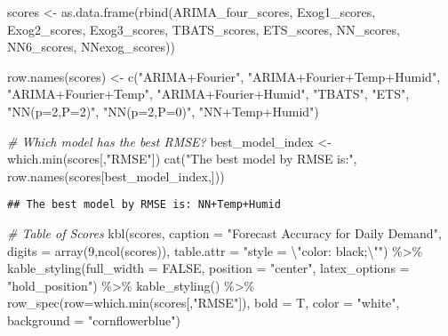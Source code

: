 \documentclass[
]{article}
\newenvironment{Shaded}{\begin{snugshade}}{\end{snugshade}}
\newcommand{\AttributeTok}[1]{\textcolor[rgb]{0.77,0.63,0.00}{#1}}
\newcommand{\CommentTok}[1]{\textcolor[rgb]{0.56,0.35,0.01}{\textit{#1}}}
\newcommand{\ConstantTok}[1]{\textcolor[rgb]{0.00,0.00,0.00}{#1}}
\newcommand{\DecValTok}[1]{\textcolor[rgb]{0.00,0.00,0.81}{#1}}
\newcommand{\FunctionTok}[1]{\textcolor[rgb]{0.00,0.00,0.00}{#1}}
\newcommand{\NormalTok}[1]{#1}
\newcommand{\OtherTok}[1]{\textcolor[rgb]{0.56,0.35,0.01}{#1}}
\newcommand{\SpecialCharTok}[1]{\textcolor[rgb]{0.00,0.00,0.00}{#1}}
\newcommand{\StringTok}[1]{\textcolor[rgb]{0.31,0.60,0.02}{#1}}
\begin{document}
\begin{Shaded}
\begin{Highlighting}[]
\NormalTok{scores }\OtherTok{\textless{}{-}} \FunctionTok{as.data.frame}\NormalTok{(}\FunctionTok{rbind}\NormalTok{(ARIMA\_four\_scores, Exog1\_scores, Exog2\_scores, Exog3\_scores, }
\NormalTok{                              TBATS\_scores, ETS\_scores, NN\_scores, NN6\_scores, NNexog\_scores))}

\FunctionTok{row.names}\NormalTok{(scores) }\OtherTok{\textless{}{-}} \FunctionTok{c}\NormalTok{(}\StringTok{"ARIMA+Fourier"}\NormalTok{, }\StringTok{"ARIMA+Fourier+Temp+Humid"}\NormalTok{, }\StringTok{"ARIMA+Fourier+Temp"}\NormalTok{, }
                       \StringTok{"ARIMA+Fourier+Humid"}\NormalTok{, }\StringTok{"TBATS"}\NormalTok{, }\StringTok{"ETS"}\NormalTok{, }\StringTok{"NN(p=2,P=2)"}\NormalTok{, }\StringTok{"NN(p=2,P=0)"}\NormalTok{, }\StringTok{"NN+Temp+Humid"}\NormalTok{)}

\CommentTok{\# Which model has the best RMSE?}
\NormalTok{best\_model\_index }\OtherTok{\textless{}{-}} \FunctionTok{which.min}\NormalTok{(scores[,}\StringTok{"RMSE"}\NormalTok{])}
\FunctionTok{cat}\NormalTok{(}\StringTok{"The best model by RMSE is:"}\NormalTok{, }\FunctionTok{row.names}\NormalTok{(scores[best\_model\_index,]))  }
\end{Highlighting}
\end{Shaded}

\begin{verbatim}
## The best model by RMSE is: NN+Temp+Humid
\end{verbatim}

\begin{Shaded}
\begin{Highlighting}[]
\CommentTok{\# Table of Scores}
\FunctionTok{kbl}\NormalTok{(scores,}
    \AttributeTok{caption =} \StringTok{"Forecast Accuracy for Daily Demand"}\NormalTok{,}
    \AttributeTok{digits =} \FunctionTok{array}\NormalTok{(}\DecValTok{9}\NormalTok{,}\FunctionTok{ncol}\NormalTok{(scores)),}
    \AttributeTok{table.attr =} \StringTok{"style = }\SpecialCharTok{\textbackslash{}"}\StringTok{color: black;}\SpecialCharTok{\textbackslash{}"}\StringTok{"}\NormalTok{) }\SpecialCharTok{\%\textgreater{}\%}
  \FunctionTok{kable\_styling}\NormalTok{(}\AttributeTok{full\_width =} \ConstantTok{FALSE}\NormalTok{, }\AttributeTok{position =} \StringTok{"center"}\NormalTok{, }\AttributeTok{latex\_options =} \StringTok{"hold\_position"}\NormalTok{) }\SpecialCharTok{\%\textgreater{}\%}
  \FunctionTok{kable\_styling}\NormalTok{() }\SpecialCharTok{\%\textgreater{}\%}
  \FunctionTok{row\_spec}\NormalTok{(}\AttributeTok{row=}\FunctionTok{which.min}\NormalTok{(scores[,}\StringTok{"RMSE"}\NormalTok{]), }\AttributeTok{bold =}\NormalTok{ T, }\AttributeTok{color =} \StringTok{"white"}\NormalTok{, }\AttributeTok{background =} \StringTok{"cornflowerblue"}\NormalTok{)}
\end{Highlighting}
\end{Shaded}
\end{document}
